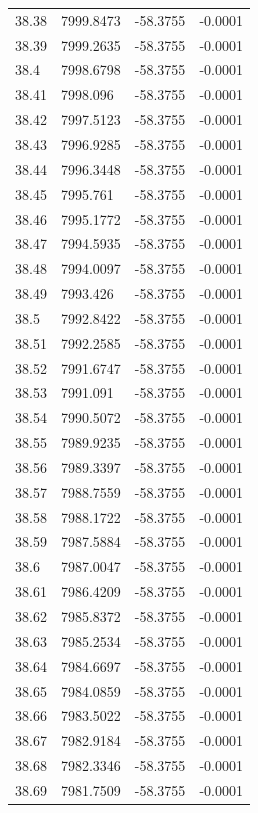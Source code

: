 \begin{table}[H]
\begin{tabular}{llll}
38.38 & 7999.8473 & -58.3755 & -0.0001 \\
38.39 & 7999.2635 & -58.3755 & -0.0001 \\
38.4 & 7998.6798 & -58.3755 & -0.0001 \\
38.41 & 7998.096 & -58.3755 & -0.0001 \\
38.42 & 7997.5123 & -58.3755 & -0.0001 \\
38.43 & 7996.9285 & -58.3755 & -0.0001 \\
38.44 & 7996.3448 & -58.3755 & -0.0001 \\
38.45 & 7995.761 & -58.3755 & -0.0001 \\
38.46 & 7995.1772 & -58.3755 & -0.0001 \\
38.47 & 7994.5935 & -58.3755 & -0.0001 \\
38.48 & 7994.0097 & -58.3755 & -0.0001 \\
38.49 & 7993.426 & -58.3755 & -0.0001 \\
38.5 & 7992.8422 & -58.3755 & -0.0001 \\
38.51 & 7992.2585 & -58.3755 & -0.0001 \\
38.52 & 7991.6747 & -58.3755 & -0.0001 \\
38.53 & 7991.091 & -58.3755 & -0.0001 \\
38.54 & 7990.5072 & -58.3755 & -0.0001 \\
38.55 & 7989.9235 & -58.3755 & -0.0001 \\
38.56 & 7989.3397 & -58.3755 & -0.0001 \\
38.57 & 7988.7559 & -58.3755 & -0.0001 \\
38.58 & 7988.1722 & -58.3755 & -0.0001 \\
38.59 & 7987.5884 & -58.3755 & -0.0001 \\
38.6 & 7987.0047 & -58.3755 & -0.0001 \\
38.61 & 7986.4209 & -58.3755 & -0.0001 \\
38.62 & 7985.8372 & -58.3755 & -0.0001 \\
38.63 & 7985.2534 & -58.3755 & -0.0001 \\
38.64 & 7984.6697 & -58.3755 & -0.0001 \\
38.65 & 7984.0859 & -58.3755 & -0.0001 \\
38.66 & 7983.5022 & -58.3755 & -0.0001 \\
38.67 & 7982.9184 & -58.3755 & -0.0001 \\
38.68 & 7982.3346 & -58.3755 & -0.0001 \\
38.69 & 7981.7509 & -58.3755 & -0.0001 \\

\end{tabular}
\end{table}
